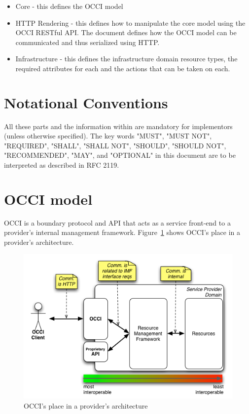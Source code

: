 \documentclass[10pt,a4paper,british]{article}
\begin{document}
\begin{itemize}
\item Core - this defines the OCCI model
\item HTTP Rendering - this defines how to manipulate the core model
  using the OCCI RESTful API. The document defines how the OCCI model
  can be communicated and thus serialized using HTTP.
\item Infrastructure - this defines the infrastructure domain resource
  types, the required attributes for each and the actions that can be
  taken on each.
\end{itemize}

\section{Notational Conventions}
All these parts and the information within are mandatory for
implementors (unless otherwise specified). The key words "MUST", "MUST
NOT", "REQUIRED", "SHALL", "SHALL NOT", "SHOULD", "SHOULD NOT",
"RECOMMENDED", "MAY", and "OPTIONAL" in this document are to be
interpreted as described in RFC 2119.

\section{OCCI model}
OCCI is a boundary protocol and API
that acts as a service front-end to a provider's internal management
framework. Figure~\ref{fig:placement} shows OCCI's place in a
provider's architecture.

\begin{figure}[!hp]
	\centering
	\includegraphics[scale=0.5]{figs/occi-intro.png}
	\caption{OCCI's place in a provider's architecture}
	\label{fig:placement}
\end{figure}
\end{document}
